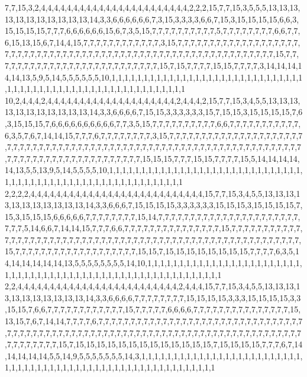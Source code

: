 7,7,15,3,2,4,4,4,4,4,4,4,4,4,4,4,4,4,4,4,4,4,4,4,4,4,4,4,2,2,2,15,7,7,15,3,5,5,5,13,13,13,13,13,13,13,13,13,13,13,14,3,3,6,6,6,6,6,6,7,3,15,3,3,3,3,6,6,7,15,3,15,15,15,15,6,6,3,15,15,15,15,7,7,7,6,6,6,6,6,6,15,6,7,3,5,15,7,7,7,7,7,7,7,7,7,7,5,7,7,7,7,7,7,7,7,6,6,7,7,6,15,13,15,6,7,14,4,15,7,7,7,7,7,7,7,7,7,7,7,7,3,15,7,7,7,7,7,7,7,7,7,7,7,7,7,7,7,7,7,7,7,7,7,7,7,7,7,7,7,7,7,7,7,7,7,7,7,7,7,7,7,7,7,7,7,7,7,7,7,7,7,7,7,7,7,7,7,7,7,7,7,7,7,15,7,7,7,7,7,7,7,7,7,7,7,7,7,7,7,7,7,7,7,7,7,7,7,7,7,7,15,7,15,7,7,7,7,15,15,7,7,7,7,3,14,14,14,14,14,13,5,9,5,14,5,5,5,5,5,5,10,1,1,1,1,1,1,1,1,1,1,1,1,1,1,1,1,1,1,1,1,1,1,1,1,1,1,1,1,1,1,1,1,1,1,1,1,1,1,1,1,1,1,1,1,1,1,1,1,1,1,1,1,1,1,1,1,1,1
10,2,4,4,4,2,4,4,4,4,4,4,4,4,4,4,4,4,4,4,4,4,4,4,4,4,2,4,4,4,2,15,7,7,15,3,4,5,5,13,13,13,13,13,13,13,13,13,13,13,14,3,3,6,6,6,6,7,15,15,3,3,3,3,3,3,15,7,15,15,3,15,15,15,15,7,6,3,15,15,15,7,6,6,6,6,6,6,6,6,6,6,7,7,3,5,15,7,7,7,7,7,7,7,7,7,7,6,6,7,7,7,7,7,7,7,7,7,7,7,6,3,5,7,6,7,14,14,15,7,7,7,6,7,7,7,7,7,7,7,7,3,15,7,7,7,7,7,7,7,7,7,7,7,7,7,7,7,7,7,7,7,7,7,7,7,7,7,7,7,7,7,7,7,7,7,7,7,7,7,7,7,7,7,7,7,7,7,7,7,7,7,7,7,7,7,7,7,7,7,7,7,7,7,7,7,7,7,7,7,7,7,7,7,7,7,7,7,7,7,7,7,7,7,7,7,7,7,7,7,7,15,15,15,7,7,7,15,15,7,7,7,7,15,5,14,14,14,14,14,13,5,5,13,9,5,14,5,5,5,5,10,1,1,1,1,1,1,1,1,1,1,1,1,1,1,1,1,1,1,1,1,1,1,1,1,1,1,1,1,1,1,1,1,1,1,1,1,1,1,1,1,1,1,1,1,1,1,1,1,1,1,1,1,1,1,1,1,1,1
2,2,2,2,4,4,4,4,4,4,4,4,4,4,4,4,4,4,4,4,4,4,4,4,4,4,4,4,4,4,4,15,7,7,15,3,4,5,5,13,13,13,13,13,13,13,13,13,13,13,14,3,3,6,6,6,7,15,15,15,15,3,3,3,3,3,3,15,15,15,3,15,15,15,15,7,15,3,15,15,15,6,6,6,6,6,7,7,7,7,7,7,7,7,15,14,7,7,7,7,7,7,7,7,7,7,7,7,7,7,7,7,7,7,7,7,7,7,7,7,7,5,14,6,6,7,14,14,15,7,7,7,6,6,7,7,7,7,7,7,7,7,7,7,7,7,7,7,7,15,7,7,7,7,7,7,7,7,7,7,7,7,7,7,7,7,7,7,7,7,7,7,7,7,7,7,7,7,7,7,7,7,7,7,7,7,7,7,7,7,7,7,7,7,7,7,7,7,7,7,7,7,7,7,7,7,7,15,7,7,7,7,7,7,7,7,7,7,7,7,7,7,7,7,7,7,7,15,15,7,15,15,15,15,15,15,15,15,7,7,7,7,6,3,5,14,14,14,14,14,14,13,5,5,5,5,5,5,5,5,14,10,1,1,1,1,1,1,1,1,1,1,1,1,1,1,1,1,1,1,1,1,1,1,1,1,1,1,1,1,1,1,1,1,1,1,1,1,1,1,1,1,1,1,1,1,1,1,1,1,1,1,1,1,1,1,1,1,1,1
2,2,4,4,4,4,4,4,4,4,4,4,4,4,4,4,4,4,4,4,4,4,4,4,4,4,4,2,4,4,4,15,7,7,15,3,4,5,5,13,13,13,13,13,13,13,13,13,13,13,14,3,3,6,6,6,6,7,7,7,7,7,7,7,7,15,15,15,15,3,3,3,15,15,15,15,3,3,15,15,7,6,6,7,7,7,7,7,7,7,7,7,7,7,7,15,7,7,7,7,7,6,6,6,6,7,7,7,7,7,7,7,7,7,7,7,7,7,7,7,15,13,15,7,6,7,14,14,7,7,7,7,6,7,7,7,7,7,7,7,7,7,7,7,7,7,7,7,7,7,7,7,7,7,7,7,7,7,7,7,7,7,7,7,7,7,7,7,7,7,7,7,7,7,7,7,7,7,7,7,7,7,7,7,7,7,7,7,7,7,7,7,7,7,7,7,7,7,7,7,7,7,7,7,7,7,7,7,7,7,7,7,7,7,7,7,7,7,7,15,7,15,15,15,15,15,15,15,15,15,15,15,15,15,7,15,15,15,15,7,7,7,6,7,14,14,14,14,14,5,5,14,9,5,5,5,5,5,5,5,14,3,1,1,1,1,1,1,1,1,1,1,1,1,1,1,1,1,1,1,1,1,1,1,1,1,1,1,1,1,1,1,1,1,1,1,1,1,1,1,1,1,1,1,1,1,1,1,1,1,1,1,1,1,1,1,1,1,1,1

